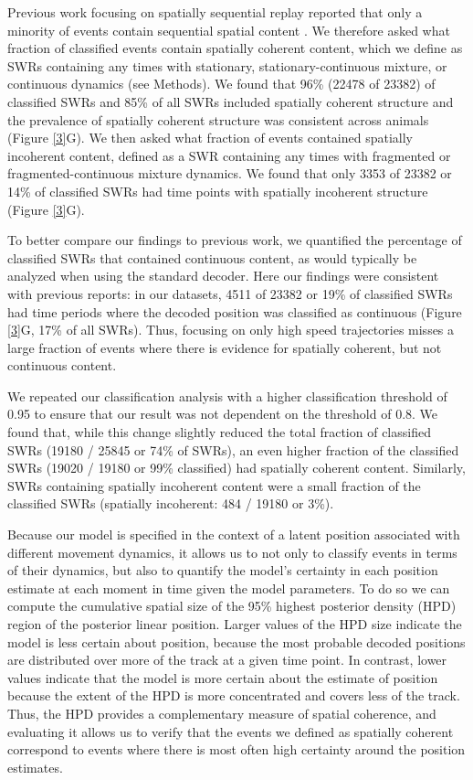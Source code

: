 \documentclass[times, twoside]{zHenriquesLab-StyleBioRxiv}
\begin{document}
Previous work focusing on spatially sequential replay reported that only a minority of events contain sequential spatial content \cite{KarlssonAwakereplayremote2009, FosterReversereplaybehavioural2006, DavidsonHippocampalReplayExtended2009}. We therefore asked what fraction of classified events contain spatially coherent content, which we define as SWRs containing any times with stationary, stationary-continuous mixture, or continuous dynamics (see Methods). We found that 96\% (22478 of 23382) of classified SWRs and 85\% of all SWRs included spatially coherent structure and the prevalence of spatially coherent structure was consistent across animals (Figure \ref{3}G). We then asked what fraction of events contained spatially incoherent content, defined as a SWR containing any times with fragmented or fragmented-continuous mixture dynamics. We found that only 3353 of 23382 or 14\% of classified SWRs had time points with spatially incoherent structure (Figure \ref{3}G).

To better compare our findings to previous work, we quantified the percentage of classified SWRs that contained continuous content, as would typically be analyzed when using the standard decoder. Here our findings were consistent with previous reports: in our datasets, 4511 of 23382 or 19\% of classified SWRs had time periods where the decoded position was classified as continuous (Figure \ref{3}G, 17\% of all SWRs). Thus, focusing on only high speed trajectories misses a large fraction of events where there is evidence for spatially coherent, but not continuous content.

We repeated our classification analysis with a higher classification threshold of 0.95 to ensure that our result was not dependent on the threshold of 0.8. We found that, while this change slightly reduced the total fraction of classified SWRs (19180 / 25845 or 74\% of SWRs), an even higher fraction of the classified SWRs (19020 / 19180 or 99\% classified) had spatially coherent content. Similarly, SWRs containing spatially incoherent content were a small fraction of the classified SWRs (spatially incoherent: 484 / 19180 or 3\%).

Because our model is specified in the context of a latent position associated with different movement dynamics, it allows us to not only to classify events in terms of their dynamics, but also to quantify the model's certainty in each position estimate at each moment in time given the model parameters. To do so we can compute the cumulative spatial size of the 95\% highest posterior density (HPD) region of the posterior linear position. Larger values of the HPD size indicate the model is less certain about position, because the most probable decoded positions are distributed over more of the track at a given time point. In contrast, lower values indicate that the model is more certain about the estimate of position because the extent of the HPD is more concentrated and covers less of the track. Thus, the HPD provides a complementary measure of spatial coherence, and evaluating it allows us to verify that the events we defined as spatially coherent correspond to events where there is most often high certainty around the position estimates. 
\end{document}
